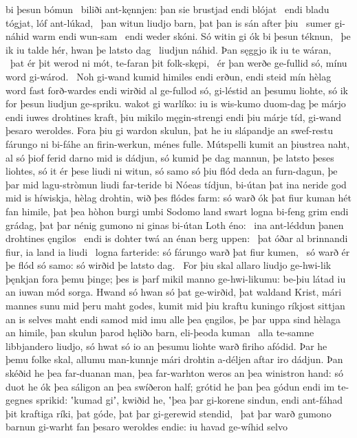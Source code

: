 bi þesun bómun \hld\ biliði ant-kęnnjen:
þan sie brustjad endi blójat \hld\ endi bladu tógjat,
lóf ant-lúkad, \hld\ þan witun liudjo barn,
þat þan is sán after þiu \hld\ sumer gi-náhid
warm endi wun-sam \hld\ endi weder skóni.
Só witin gi ók bi þesun téknun, \hld\ þe ik iu talde hér,
hwan þe latsto dag \hld\ liudjun náhid.
Þan sęggjo ik iu te wáran, \hld\ þat ér þit werod ni mót,
te-faran þit folk-skępi, \hld\ ér þan werðe ge-fullid só,
mínu word gi-wárod. \hld\ Noh gi-wand kumid
himiles endi erðun, endi steid mín hèlag word
fast forð-wardes endi wirðid al ge-fullod só,
gi-léstid an þesumu liohte, só ik for þesun liudjun ge-spriku.
wakot gi warlíko: iu is wis-kumo
duom-dag þe márjo endi iuwes drohtines kraft,
þiu mikilo męgin-strengi endi þiu márje tíd,
gi-wand þesaro weroldes. Fora þiu gi wardon skulun,
þat he iu slápandje an swef-restu
fárungo ni bi-fáhe an firin-werkun,
ménes fulle. Mútspelli kumit
an þiustrea naht, al só þiof ferid
darno mid is dádjun, só kumid þe dag mannun,
þe latsto þeses liohtes, só it ér þese liudi ni witun,
só samo só þiu flód deda an furn-dagun,
þe þar mid lagu-stròmun liudi far-teride
bi Nóeas tídjun, bi-útan þat ina neride god
mid is híwiskja, hèlag drohtin,
wið þes flódes farm: só warð ók þat fiur kuman
hét fan himile, þat þea hòhon burgi
umbi Sodomo land swart logna bi-feng
grim endi grádag, þat þar nénig gumono ni ginas
bi-útan Loth éno: \hld\ ina ant-léddun þanen
drohtines ęngilos \hld\ endi is dohter twá
an énan berg uppen: \hld\ þat óðar al brinnandi fiur,
ia land ia liudi \hld\ logna farteride:
só fárungo warð þat fiur kumen, \hld\ só warð ér þe flód só samo:
só wirðid þe latsto dag. \hld\ For þiu skal allaro liudjo ge-hwi-lik
þęnkjan fora þemu þinge; þes is þarf mikil
manno ge-hwi-likumu: be-þiu látad iu an iuwan mód sorga.
Hwand só hwan só þat ge-wirðid, þat waldand Krist,
mári mannes sunu mid þeru maht godes,
kumit mid þiu kraftu kuningo ríkjost
sittjan an is selves maht endi samod mid imu
alle þea ęngilos, þe þar uppa sind
hèlaga an himile, þan skulun þarod hęliðo barn,
eli-þeoda kuman \hld\ alla te-samne
libbjandero liudjo, só hwat só io an þesumu liohte warð
firiho afódid. Þar he þemu folke skal,
allumu man-kunnje mári drohtin
a-déljen aftar iro dádjun. Þan skéðid he þea far-duanan man,
þea far-warhton weros an þea winistron hand:
só duot he ók þea sáligon an þea swíðeron half;
grótid he þan þea gódun endi im te-gegnes sprikid:
ʽkumad giʼ, kwiðid he, ʽþea þar gi-korene sindun, endi ant-fáhad þit kraftiga ríki,
þat góde, þat þar gi-gerewid stendid, \hld\ þat þar warð gumono barnun
gi-warht fan þesaro weroldes endie: iu havad ge-wíhid selvo
